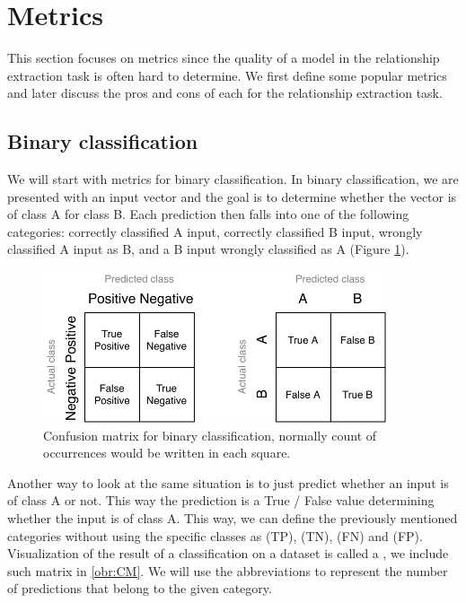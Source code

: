 \section{Metrics}
This section focuses on metrics since the quality of a model in the relationship extraction task is often hard to determine. We first define some popular metrics and later discuss the pros and cons of each for the relationship extraction task.

\subsection{Binary classification}

We will start with metrics for binary classification. In binary classification, we are presented with an input vector and the goal is to determine whether the vector is of class A for class B. Each prediction then falls into one of the following categories: correctly classified A input, correctly classified B input, wrongly classified A input as B, and a B input wrongly classified as A (Figure \ref{obr:CM}). 

\begin{figure}[h]\centering
\includegraphics[width=0.9\textwidth]{./img//Diplomka diagramy-Confusion matric}
\caption{Confusion matrix for binary classification, normally count of occurrences would be written in each square. }
\label{obr:CM}
\end{figure}

Another way to look at the same situation is to just predict whether an input is of class A or not. This way the prediction is a True / False value determining whether the input is of class A. This way, we can define the previously mentioned categories without using the specific classes as  (TP),  (TN),  (FN) and  (FP). Visualization of the result of a classification on a dataset is called a , we include such matrix in \autoref{obr:CM}. We will use the abbreviations to represent the number of predictions that belong to the given category.  



